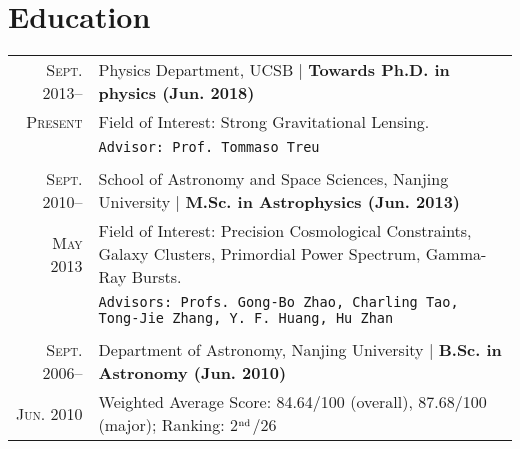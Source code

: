 \documentclass[10pt]{article}
\begin{document}
\section{Education}
\begin{tabular}{r|p{17.5cm}}
  \textsc{Sept. 2013}--      &   Physics Department, UCSB    |   \textbf{Towards Ph.D. in physics (Jun. 2018)}   \\
  \textsc{Present}
  & Field of Interest: Strong Gravitational Lensing.     \\
  &   \texttt{Advisor: Prof. Tommaso Treu}     \\
  \multicolumn{2}{c}{} \\
  \textsc{Sept. 2010}--     &   School of Astronomy and Space Sciences, Nanjing University  |  \textbf{M.Sc. in Astrophysics (Jun. 2013)}   \\
  \textsc{May 2013}
  & Field of Interest: Precision Cosmological Constraints, Galaxy Clusters, Primordial Power Spectrum, Gamma-Ray Bursts. \\
  & \texttt{Advisors: Profs. Gong-Bo Zhao, Charling Tao, Tong-Jie Zhang, Y. F. Huang, Hu Zhan}   \\
  \multicolumn{2}{c}{} \\
  \textsc{Sept. 2006}--     &   Department of Astronomy, Nanjing University  |  \textbf{B.Sc. in Astronomy (Jun. 2010)}    \\
  \textsc{Jun. 2010}       &   Weighted Average Score: 84.64/100 (overall), 87.68/100 (major); Ranking: 2$^{\rm nd}$/26  \\
\end{tabular}

\vspace{1em}
\end{document}

